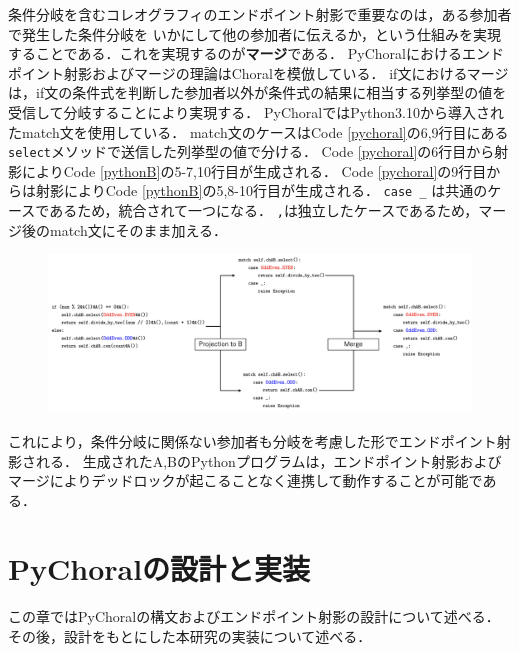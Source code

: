 \documentclass{thesis}
\begin{document}
条件分岐を含むコレオグラフィのエンドポイント射影で重要なのは，ある参加者で発生した条件分岐を
いかにして他の参加者に伝えるか，という仕組みを実現することである．これを実現するのが\textbf{マージ}である．
PyChoralにおけるエンドポイント射影およびマージの理論はChoralを模倣している．
if文におけるマージは，if文の条件式を判断した参加者以外が条件式の結果に相当する列挙型の値を受信して分岐することにより実現する．
PyChoralではPython3.10から導入されたmatch文を使用している．
match文のケースはCode \ref{pychoral}の6,9行目にある\texttt{select}メソッドで送信した列挙型の値で分ける．
Code \ref{pychoral}の6行目から射影によりCode \ref{pythonB}の5-7,10行目が生成される．
Code \ref{pychoral}の9行目からは射影によりCode \ref{pythonB}の5,8-10行目が生成される．
\texttt{case \_} は共通のケースであるため，統合されて一つになる．
\texttt{{\color{red}{OddEven.EVEN}},{\color{blue}{OddEven.ODD}}}は独立したケースであるため，マージ後のmatch文にそのまま加える．
\begin{figure}[H]
  \centering
  \includegraphics[scale=0.413]{image/merge.png}
\end{figure}

これにより，条件分岐に関係ない参加者も分岐を考慮した形でエンドポイント射影される．
生成されたA,BのPythonプログラムは，エンドポイント射影およびマージによりデッドロックが起こることなく連携して動作することが可能である．
\chapter{PyChoralの設計と実装}
この章ではPyChoralの構文およびエンドポイント射影の設計について述べる．その後，設計をもとにした本研究の実装について述べる．
\end{document}
